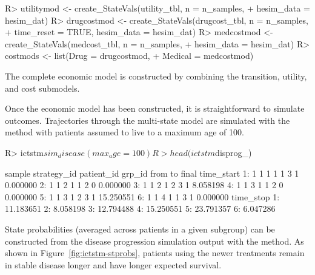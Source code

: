 \documentclass[article, nojss]{jss}\usepackage[]{graphicx}\usepackage[]{color}
\begin{document}
\begin{Schunk}
\begin{Sinput}
R> utilitymod <- create_StateVals(utility_tbl, n = n_samples, 
+                                 hesim_data = hesim_dat)
R> drugcostmod <- create_StateVals(drugcost_tbl, n = n_samples,
+                                  time_reset = TRUE, hesim_data = hesim_dat)
R> medcostmod <- create_StateVals(medcost_tbl, n = n_samples,
+                                 hesim_data = hesim_dat)
R> costmods <- list(Drug = drugcostmod,
+                   Medical = medcostmod)
\end{Sinput}
\end{Schunk}

The complete economic model is constructed by combining the transition, utility, and cost submodels.

\begin{Schunk}
\end{Schunk}

Once the economic model has been constructed, it is straightforward to simulate outcomes. Trajectories through the multi-state model are simulated with the  method with patients assumed to live to a maximum age of 100.

\begin{Schunk}
\begin{Sinput}
R> ictstm$sim_disease(max_age = 100)
R> head(ictstm$disprog_)
\end{Sinput}
\begin{Soutput}
   sample strategy_id patient_id grp_id from to final time_start
1:      1           1          1      1    1  3     1   0.000000
2:      1           1          2      1    1  2     0   0.000000
3:      1           1          2      1    2  3     1   8.058198
4:      1           1          3      1    1  2     0   0.000000
5:      1           1          3      1    2  3     1  15.250551
6:      1           1          4      1    1  3     1   0.000000
   time_stop
1: 11.183651
2:  8.058198
3: 12.794488
4: 15.250551
5: 23.791357
6:  6.047286
\end{Soutput}
\end{Schunk}

State probabilities (averaged across patients in a given subgroup) can be constructed from the disease progression simulation output with the  method. As shown in Figure~\ref{fig:ictstm-stprobs}, patients using the newer treatments remain in stable disease longer and have longer expected survival.  
\end{document}

